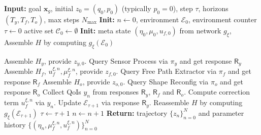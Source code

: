 \begin{algorithm}[h!]
\caption{Online GRL-SNAM pipeline}
\label{algo:online_grl_snam_main:short}
\begin{algorithmic}[1]
\State \textbf{Input:} goal $\mathbf{x}_g$, initial $z_0=(q_0,p_0)$ (typically $p_0{=}0$), step $\tau$, horizons $(T_y,T_f,T_o)$, max steps $N_{\max}$
\State \textbf{Init:} $n\!\leftarrow\!0$, environment $\mathcal{E}_0$, environment counter $\tau\gets 0$ active set $\mathcal{C}_0\!\leftarrow\!\emptyset$
\State \textbf{Init:} meta state $(\eta_0,\mu_0,u_{f,0})$ from network $g_\xi$,
\State Assemble $H$ by computing $g_{\xi}(\mathcal{E}_{0})$
    
        \State Assemble $H_y$, provide $z_{y,0}$.
        \State Query Sensor Process via $\pi_y$ and get response $\mathsf{R}_y$
    \EndIf
        \State Assemble $H_f$, $u_{f}^{\xi,n}, \mu_{f}^{\xi,n}$, provide $z_{f,0}$.
        \State Query Free Path Extractor via $\pi_f$ and get response $\mathsf{R}_f$
    \EndIf
        \State Assemble $H_o$, provide $z_{o,0}$.
        \State Query Shape Reconfig via $\pi_o$ and get response $\mathsf{R}_o$
    \EndIf
    \State Collect QoIs $y_n$ from responses $\mathsf{R}_y$, $\mathsf{R}_f$ and $\mathsf{R}_o$.
    \State Compute correction term $u_f^{\xi,n}$ via $y_n$.
    \State Update $\mathcal{E}_{\tau+1}$ via response $\mathsf{R}_y$.
    \State Reassemble $H$ by computing $g_{\xi}(\mathcal{E}_{\tau+1})$
    \State $\tau\gets \tau+1$
    \EndIf
    \State $n\leftarrow n+1$
\EndWhile
\State \textbf{Return:} trajectory $\{z_n\}_{n=0}^{N}$ and parameter history $\{(\eta_n,\mu_{f}^{\xi,n},u_{f}^{\xi,n})\}_{n=0}^{N}$
\end{algorithmic}
\end{algorithm}